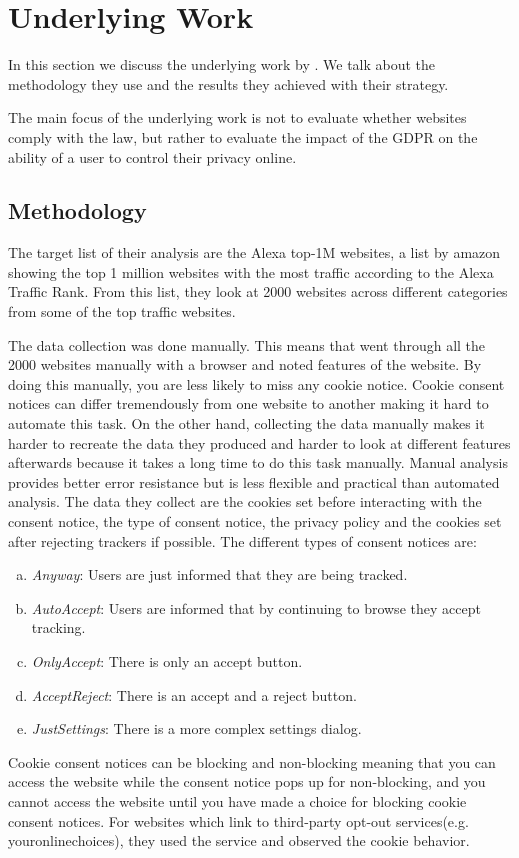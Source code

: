 \section{Underlying Work}
\label{sec:underlying}

In this section we discuss the underlying work by . We talk about the methodology they use and the
results they achieved with their strategy.

The main focus of the underlying work is not to evaluate whether websites comply with the law, but rather to evaluate
the impact of the GDPR on the ability of a user to control their privacy online.

\subsection{Methodology}
\label{subsec:methodology}

The target list of their analysis are the Alexa top-1M websites, a list by amazon showing the top 1 million websites with
the most traffic according to the Alexa Traffic Rank. From this list, they look at 2000 websites across different
categories from some of the top traffic websites.

The data collection was done manually. This means that \citeauthor{sanchez2019can} went through all the 2000 websites
manually with a browser and noted features of the website. By doing this manually, you are less likely to miss any cookie notice.
Cookie consent notices can differ tremendously from one website to another making it hard to
automate this task. On the other hand, collecting the data manually makes it harder to recreate the data they produced
and harder to look at different features afterwards because it takes a long time to do this task manually.
Manual analysis provides better error resistance but is
less flexible and practical than automated analysis. The data they collect are the cookies set before interacting with the
consent notice, the type of consent notice, the privacy policy and the cookies set after rejecting trackers if possible.
The different types of consent notices are:
\begin{enumerate}[a)]
    \item \emph{Anyway}: Users are just informed that they are being tracked.
    \item \emph{AutoAccept}: Users are informed that by continuing to browse they accept tracking.
    \item \emph{OnlyAccept}: There is only an accept button.
    \item \emph{AcceptReject}: There is an accept and a reject button.
    \item \emph{JustSettings}: There is a more complex settings dialog.
\end{enumerate}
Cookie consent notices can be blocking and non-blocking meaning that you can access the website while the consent notice pops up for
non-blocking, and you cannot access the website until you have made a choice for blocking cookie consent notices. For
websites which link to third-party opt-out services(e.g. youronlinechoices), they used the service and observed the
cookie behavior.

